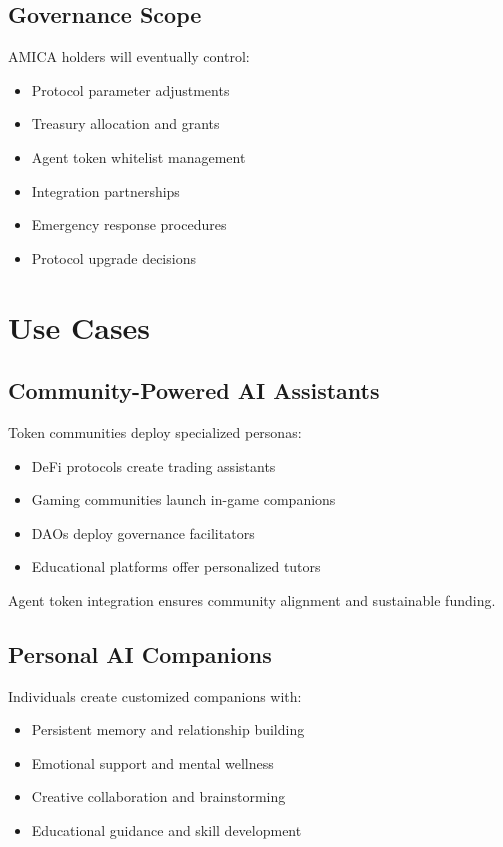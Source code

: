 \documentclass{article}
\begin{document}
\subsection{Governance Scope}

AMICA holders will eventually control:
\begin{itemize}
    \item Protocol parameter adjustments
    \item Treasury allocation and grants
    \item Agent token whitelist management
    \item Integration partnerships
    \item Emergency response procedures
    \item Protocol upgrade decisions
\end{itemize}

\section{Use Cases}

\subsection{Community-Powered AI Assistants}

Token communities deploy specialized personas:
\begin{itemize}
    \item DeFi protocols create trading assistants
    \item Gaming communities launch in-game companions
    \item DAOs deploy governance facilitators
    \item Educational platforms offer personalized tutors
\end{itemize}

Agent token integration ensures community alignment and sustainable funding.

\subsection{Personal AI Companions}

Individuals create customized companions with:
\begin{itemize}
    \item Persistent memory and relationship building
    \item Emotional support and mental wellness
    \item Creative collaboration and brainstorming
    \item Educational guidance and skill development
\end{itemize}
\end{document}
